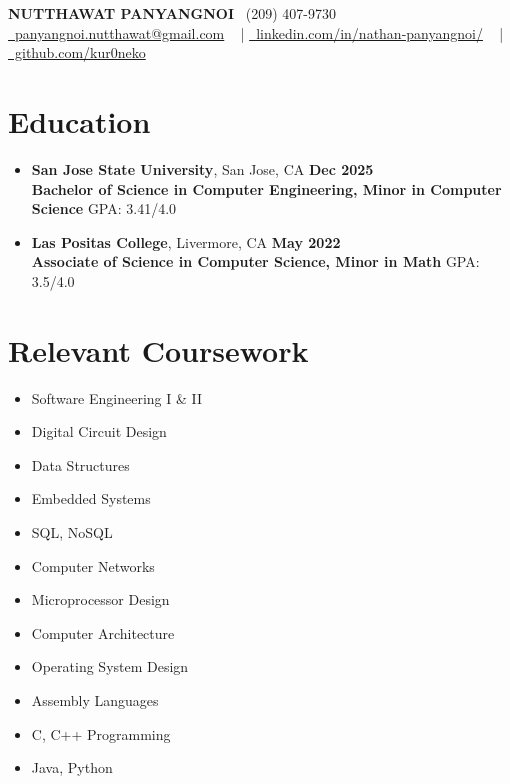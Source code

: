 \documentclass[letterpaper,11pt]{article}
\begin{document}
\vspace{-10pt}
\begin{center}
    {\Large \textbf{NUTTHAWAT PANYANGNOI}} \vspace{1pt} 
    \small 
    \raisebox{-0.1\height}\faPhone\ (209) 407-9730 \\
    \href{mailto:panyangnoi.nutthawat@gmail.com}{\raisebox{-0.2\height}\faEnvelope\ panyangnoi.nutthawat@gmail.com} ~ |
    \href{https://www.linkedin.com/in/nathan-panyangnoi/}{\raisebox{-0.2\height}\faLinkedin\ linkedin.com/in/nathan-panyangnoi/} ~ |
    \href{https://github.com/kur0neko}{\raisebox{-0.2\height}\faGithub\ github.com/kur0neko} 
    \vspace{-8pt}
\end{center}

\section{Education}
\begin{itemize}[leftmargin=0.15in, label={}]
    \item \textbf{San Jose State University}, San Jose, CA \hfill \textbf{Dec 2025} \\ 
    \textbf{Bachelor of Science in Computer Engineering, Minor in Computer Science} GPA: 3.41/4.0
    \item \textbf{Las Positas College}, Livermore, CA \hfill \textbf{May 2022}  \\
    \textbf{Associate of Science in Computer Science, Minor in Math} GPA: 3.5/4.0
\end{itemize}

\section{Relevant Coursework}
\begin{multicols}{3}
    \begin{itemize}[itemsep=1pt, parsep=2pt]
        \item Software Engineering I \& II
        \item Digital Circuit Design
        \item Data Structures
        \item Embedded Systems
        \item SQL, NoSQL
        \item Computer Networks
        \item Microprocessor Design
        \item Computer Architecture
        \item Operating System Design
        \item Assembly Languages
        \item C, C++ Programming
        \item Java, Python
    \end{itemize}
\end{multicols}
\end{document}
